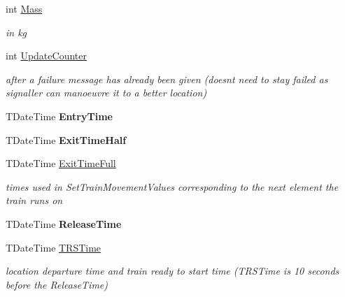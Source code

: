 \begin{DoxyCompactItemize}
int \mbox{\hyperlink{class_t_train_ab9dabc7092d31bc27b573e75ac74d0da}{Mass}}
\begin{DoxyCompactList}\small\item\em in kg \end{DoxyCompactList}\item 
int \mbox{\hyperlink{class_t_train_ae57749c241ad7256c6f628faf1168ce7}{Update\+Counter}}
\begin{DoxyCompactList}\small\item\em after a failure message has already been given (doesn\textquotesingle{}t need to stay failed as signaller can manoeuvre it to a better location) \end{DoxyCompactList}\item 
\mbox{\label{class_t_train_a6baa340127335e185e91f150ab93986f}} 
T\+Date\+Time {\bfseries Entry\+Time}
\item 
\mbox{\label{class_t_train_a8e1741c26fe9887f84f1491d16e52f0d}} 
T\+Date\+Time {\bfseries Exit\+Time\+Half}
\item 
\mbox{\label{class_t_train_abe007893bd4ba34a70260734107d9cc4}} 
T\+Date\+Time \mbox{\hyperlink{class_t_train_abe007893bd4ba34a70260734107d9cc4}{Exit\+Time\+Full}}
\begin{DoxyCompactList}\small\item\em times used in Set\+Train\+Movement\+Values corresponding to the next element the train runs on \end{DoxyCompactList}\item 
\mbox{\label{class_t_train_a284962532ed0464d56031f46bae2354a}} 
T\+Date\+Time {\bfseries Release\+Time}
\item 
\mbox{\label{class_t_train_a7d04648c56b58359d476792c22800657}} 
T\+Date\+Time \mbox{\hyperlink{class_t_train_a7d04648c56b58359d476792c22800657}{T\+R\+S\+Time}}
\begin{DoxyCompactList}\small\item\em location departure time and \textquotesingle{}train ready to start\textquotesingle{} time (T\+R\+S\+Time is 10 seconds before the Release\+Time) \end{DoxyCompactList}\item 
\mbox{\label{class_t_train_a1887a95dd5762926ac67d244dd471e45}} 

\end{DoxyCompactItemize}
